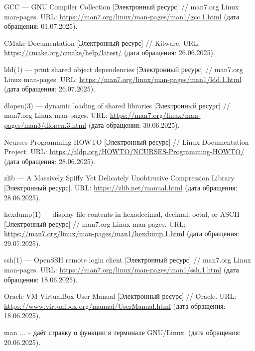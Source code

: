 
\begin{thebibliography}{99}

GCC — GNU Compiler Collection [Электронный ресурс] // man7.org Linux man-pages. URL: \url{https://man7.org/linux/man-pages/man1/gcc.1.html} (дата обращения: 01.07.2025).

CMake Documentation [Электронный ресурс] // Kitware. URL: \url{https://cmake.org/cmake/help/latest/} (дата обращения: 26.06.2025).

ldd(1) — print shared object dependencies [Электронный ресурс] // man7.org Linux man-pages. URL: \url{https://man7.org/linux/man-pages/man1/ldd.1.html} (дата обращения: 26.07.2025).

dlopen(3) — dynamic loading of shared libraries [Электронный ресурс] // man7.org Linux man-pages. URL: \url{https://man7.org/linux/man-pages/man3/dlopen.3.html} (дата обращения: 30.06.2025).

Ncurses Programming HOWTO [Электронный ресурс] // Linux Documentation Project. URL: \url{https://tldp.org/HOWTO/NCURSES-Programming-HOWTO/} (дата обращения: 28.06.2025).

zlib — A Massively Spiffy Yet Delicately Unobtrusive Compression Library [Электронный ресурс]. URL: \url{https://zlib.net/manual.html} (дата обращения: 28.06.2025).

hexdump(1) — display file contents in hexadecimal, decimal, octal, or ASCII [Электронный ресурс] // man7.org Linux man-pages. URL: \url{https://man7.org/linux/man-pages/man1/hexdump.1.html} (дата обращения: 29.07.2025).

ssh(1) — OpenSSH remote login client [Электронный ресурс] // man7.org Linux man-pages. URL: \url{https://man7.org/linux/man-pages/man1/ssh.1.html} (дата обращения: 18.06.2025).

Oracle VM VirtualBox User Manual [Электронный ресурс] // Oracle. URL: \url{https://www.virtualbox.org/manual/UserManual.html} (дата обращения: 18.06.2025).


man ... -- даёт стравку о функции в терминале GNU/Linux.
(дата обращения: 20.06.2025).


\end{thebibliography}
